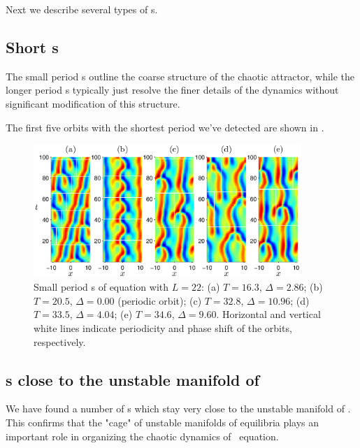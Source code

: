 Next we describe several types of \rpo s.

\subsection{Short \rpo s}  The small period \rpo s outline the
coarse structure of the chaotic attractor, while the longer period
\rpo s typically just resolve the finer details of the dynamics
without significant modification of this structure.

The first five orbits with the shortest period we've detected are
shown in .

\begin{figure}[t]
\begin{center}
\includegraphics[width=0.9\textwidth]{figs/ks22rpoShort.eps}
\end{center}
\caption{Small period \rpo s of \KS equation with $L = 22$: (a) $T =
16.3$, $\Delta = 2.86$; (b) $T = 20.5$, $\Delta = 0.00$ (periodic
orbit); (c) $T = 32.8$, $\Delta = 10.96$; (d) $T = 33.5$, $\Delta =
4.04$; (e) $T = 34.6$, $\Delta = 9.60$.  Horizontal and vertical
white lines indicate periodicity and phase shift of the orbits,
respectively. }\label{f:ks22rposShort}
\end{figure}


\subsection{\Rpo s close to the unstable manifold of  }
We have found a number of \rpo s which stay very close to the
unstable manifold of .  This confirms that the "cage" of
unstable manifolds of equilibria plays an important role in
organizing the chaotic dynamics of \KS\ equation.

